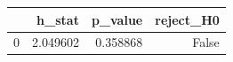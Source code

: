 \begin{tabular}{lrrr}
\toprule
 & h_stat & p_value & reject_H0 \\
\midrule
0 & 2.049602 & 0.358868 & False \\
\bottomrule
\end{tabular}
